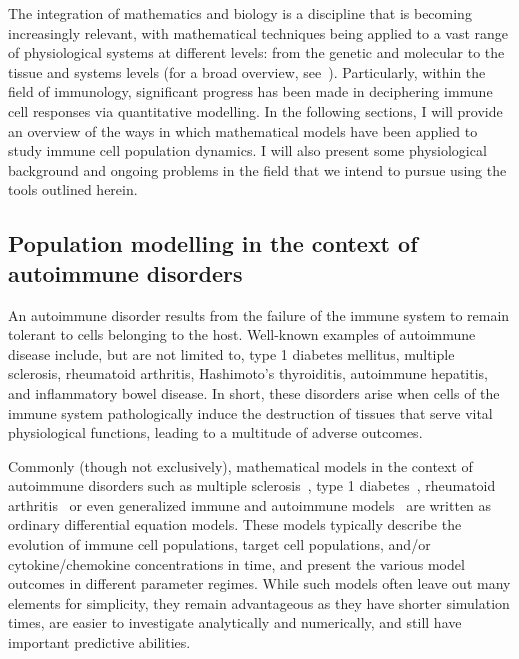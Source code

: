 The integration of mathematics and biology is a discipline that is becoming increasingly relevant, with mathematical techniques being applied to a vast range of physiological systems at different levels: from the genetic and molecular to the tissue and systems levels (for a broad overview, see~\cite{keener1998mathematical}). Particularly, within the field of immunology, significant progress has been made in deciphering immune cell responses via quantitative modelling. In the following sections, I will provide an overview of the ways in which mathematical models have been applied to study immune cell population dynamics. I will also present some physiological background and ongoing problems in the field that we intend to pursue using the tools outlined herein.

\subsection*{Population modelling in the context of autoimmune disorders}

An autoimmune disorder results from the failure of the immune system to remain tolerant to cells belonging to the host. Well-known examples of autoimmune disease include, but are not limited to, type 1 diabetes mellitus, multiple sclerosis, rheumatoid arthritis, Hashimoto's thyroiditis, autoimmune hepatitis, and inflammatory bowel disease. In short, these disorders arise when cells of the immune system pathologically induce the destruction of tissues that serve vital physiological functions, leading to a multitude of adverse outcomes.

Commonly (though not exclusively), mathematical models in the context of autoimmune disorders such as multiple sclerosis~\cite{elettreby2020simple,pernice2019computational}, type 1 diabetes~\cite{khadra2009role,khadra2011investigating,jaberi2014autoimmune}, rheumatoid arthritis~\cite{baker2013mathematical} or even generalized immune and autoimmune models~\cite{alexander2011self,lorenzi2015mathematical,kim2007modeling} are written as ordinary differential equation models. These models typically describe the evolution of immune cell populations, target cell populations, and/or cytokine/chemokine concentrations in time, and present the various model outcomes in different parameter regimes. While such models often leave out many elements for simplicity, they remain advantageous as they have shorter simulation times, are easier to investigate analytically and numerically, and still have important predictive abilities.

